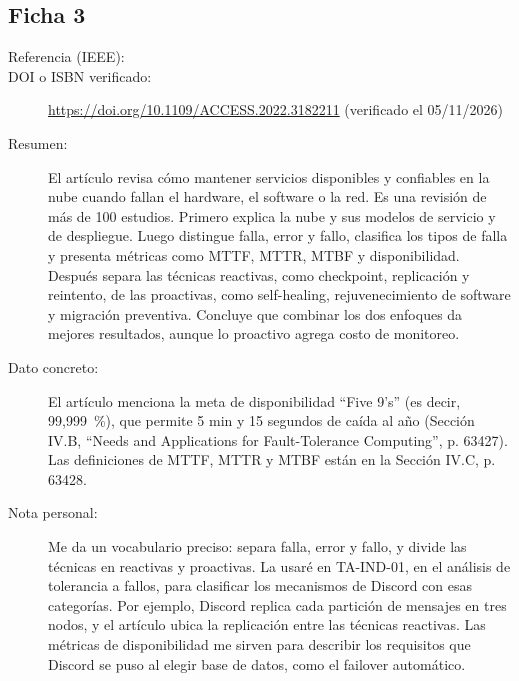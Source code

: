 \subsection{Ficha 3}
\begin{description}
  \item[Referencia (IEEE):] 
  \item[DOI o ISBN verificado:] \url{https://doi.org/10.1109/ACCESS.2022.3182211} (verificado el 05/11/2026)
  \item[Resumen:] El artículo revisa cómo mantener servicios disponibles y confiables en la nube cuando fallan el hardware, el software o la red. Es una revisión de más de 100 estudios. Primero explica la nube y sus modelos de servicio y de despliegue. Luego distingue falla, error y fallo, clasifica los tipos de falla y presenta métricas como MTTF, MTTR, MTBF y disponibilidad. Después separa las técnicas reactivas, como checkpoint, replicación y reintento, de las proactivas, como self-healing, rejuvenecimiento de software y migración preventiva. Concluye que combinar los dos enfoques da mejores resultados, aunque lo proactivo agrega costo de monitoreo.
  \item[Dato concreto:] El artículo menciona la meta de disponibilidad \enquote{Five 9's} (es decir, 99,999~\%), que permite 5 min y 15 segundos de caída al año (Sección IV.B, \enquote{Needs and Applications for Fault-Tolerance Computing}, p. 63427). Las definiciones de MTTF, MTTR y MTBF están en la Sección IV.C, p. 63428.
  \item[Nota personal:] Me da un vocabulario preciso: separa falla, error y fallo, y divide las técnicas en reactivas y proactivas. La usaré en TA-IND-01, en el análisis de tolerancia a fallos, para clasificar los mecanismos de Discord con esas categorías. Por ejemplo, Discord replica cada partición de mensajes en tres nodos, y el artículo ubica la replicación entre las técnicas reactivas. Las métricas de disponibilidad me sirven para describir los requisitos que Discord se puso al elegir base de datos, como el failover automático.
\end{description}

